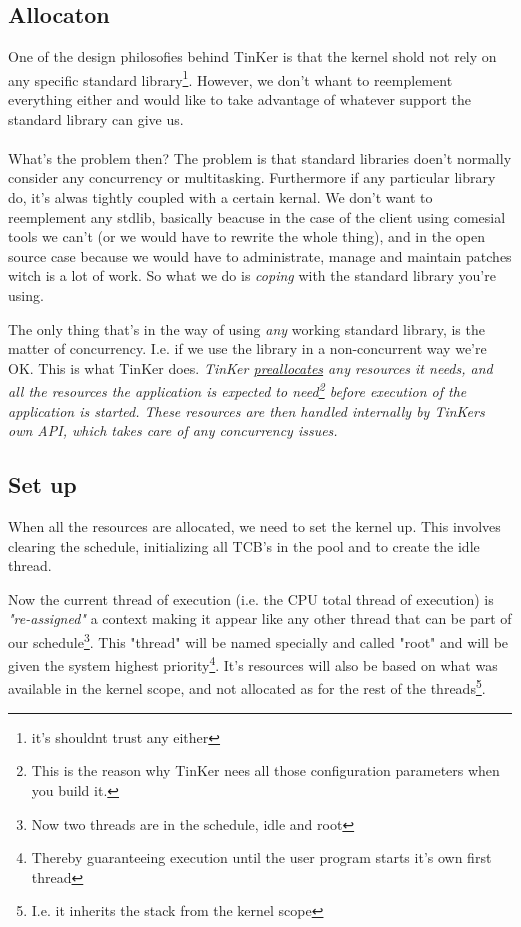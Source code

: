 	\subsection{Allocaton}
		One of the design philosofies behind TinKer is that the kernel shold not rely on any specific standard library\footnote{it's shouldnt trust any either}. However, we don't whant to reemplement everything either and would like to take advantage of whatever support the standard library can give us.
		\\\\
		What's the problem then? The problem is that standard libraries doen't normally consider any concurrency or multitasking. Furthermore if any particular library do, it's alwas tightly coupled with a certain kernal. We don't want to reemplement any stdlib, basically beacuse in the case of the client using comesial tools we can't (or we would have to rewrite the whole thing), and in the open source case because we would have to administrate, manage and maintain patches witch is a lot of work. So what we do is \textit{coping} with the standard library you're using.

		The only thing that's in the way of using \textit{any} working standard library, is the matter of concurrency. I.e. if we use the library in a non-concurrent way we're OK. This is what TinKer does. \textit{TinKer \underline{preallocates} any resources it needs, and all the resources the application is expected to need\footnote{This is the reason why TinKer nees all those configuration parameters when you build it.} before execution of the application is started. These resources are then handled internally by TinKers own API, which takes care of any concurrency issues.}

	\subsection{Set up}
		When all the resources are allocated, we need to set the kernel up. This involves clearing the schedule, initializing all TCB's in the pool and to create the idle thread.

		Now the current thread of execution (i.e. the CPU total thread of execution) is \textit{"re-assigned"} a context making it appear like any other thread that can be part of our schedule\footnote{Now two threads are in the schedule, idle and root}. This "thread" will be named specially and called "root" and will be given the system highest priority\footnote{Thereby guaranteeing execution until the user program starts it's own first thread}. It's resources will also be based on what was available in the kernel scope, and not allocated as for the rest of the threads\footnote{I.e. it inherits the stack from the kernel scope}.


